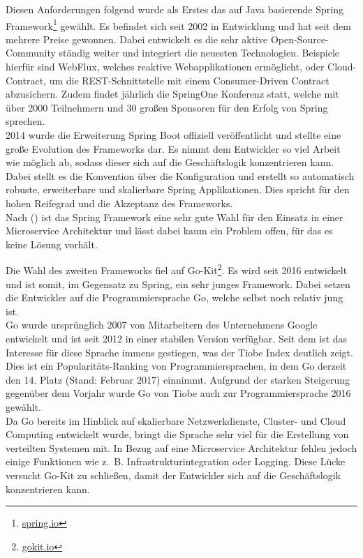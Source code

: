 Diesen Anforderungen folgend wurde als Erstes das auf Java basierende Spring Framework\footnote{\url{spring.io}} gewählt. Es befindet sich seit 2002 in Entwicklung und hat seit dem mehrere Preise gewonnen\cite[1]{Gutierrez2016}. Dabei entwickelt es die sehr aktive Open-Source-Community ständig weiter und integriert die neuesten Technologien. Beispiele hierfür sind WebFlux, welches reaktive Webapplikationen ermöglicht, oder Cloud-Contract, um die \ac{REST}-Schnittstelle mit einem Consumer-Driven Contract abzusichern. Zudem findet jährlich die SpringOne Konferenz statt, welche mit über 2000 Teilnehmern und 30 großen Sponsoren für den Erfolg von Spring sprechen\cite{SpringOne2016}.\\
2014 wurde die Erweiterung Spring Boot offiziell veröffentlicht und stellte eine große Evolution des Frameworks dar. Es nimmt dem Entwickler so viel Arbeit wie möglich ab, sodass dieser sich auf die Geschäftslogik konzentrieren kann. Dabei stellt es die Konvention über die Konfiguration und erstellt so automatisch robuste, erweiterbare und skalierbare Spring Applikationen\cite[1]{Gutierrez2016}. Dies spricht für den hohen Reifegrad und die Akzeptanz des Frameworks.\\
Nach \citeauthor{Wolff2016} (\citeyear{Wolff2016}) ist das Spring Framework eine sehr gute Wahl für den Einsatz in einer Microservice Architektur und lässt dabei kaum ein Problem offen, für das es keine Lösung vorhält. 

Die Wahl des zweiten Frameworks fiel auf Go-Kit\footnote{\url{gokit.io}}. Es wird seit 2016 entwickelt und ist somit, im Gegensatz zu Spring, ein sehr junges Framework. Dabei setzen die Entwickler auf die Programmiersprache Go, welche selbst noch relativ jung ist. \\
Go wurde ursprünglich 2007 von Mitarbeitern des Unternehmens Google\cite{Golang2009} entwickelt und ist seit 2012 in einer stabilen Version verfügbar. Seit dem ist das Interesse für diese Sprache immens gestiegen, was der Tiobe Index deutlich zeigt. Dies ist ein Popularitäts-Ranking von Programmiersprachen, in dem Go derzeit den 14. Platz (Stand: Februar 2017) einnimmt\cite{Tiobe2016}. Aufgrund der starken Steigerung gegenüber dem Vorjahr wurde Go von Tiobe auch zur Programmiersprache 2016 gewählt.\\
Da Go bereits im Hinblick auf skalierbare Netzwerkdienste, Cluster- und Cloud Computing entwickelt wurde, bringt die Sprache sehr viel für die Erstellung von verteilten Systemen mit. In Bezug auf eine Microservice Architektur fehlen jedoch einige Funktionen wie z.~B. Infrastrukturintegration oder Logging. Diese Lücke versucht Go-Kit zu schließen, damit der Entwickler sich auf die Geschäftslogik konzentrieren kann.

